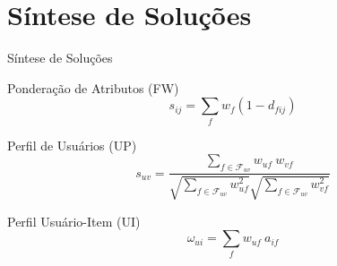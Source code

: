 \section[Síntese de Soluções]{Síntese de Soluções}
\begin{frame}{Síntese de Soluções}
\begin{alertblock}{Ponderação de Atributos (FW)}
$$
    s_{ij} = \sum_{f}{w_{f} \left(1-d_{fij}\right)}
$$
\end{alertblock}

\begin{block}{Perfil de Usuários (UP)}
$$
    s_{uv} = \frac{\sum\limits_{f \in \mathcal{F}_{uv}}{w_{uf}~w_{vf}}}{\sqrt{\sum\limits_{f \in \mathcal{F}_{uv}
    }w_{uf}^2} \sqrt{\sum\limits_{f \in \mathcal{F}_{uv}}w_{vf}^2}} 
$$
\end{block}

\begin{exampleblock}{Perfil Usuário-Item (UI)}
$$
    \omega_{ui} = \sum_{f}{w_{uf}~a_{if}}
$$
\end{exampleblock}


\end{frame}




